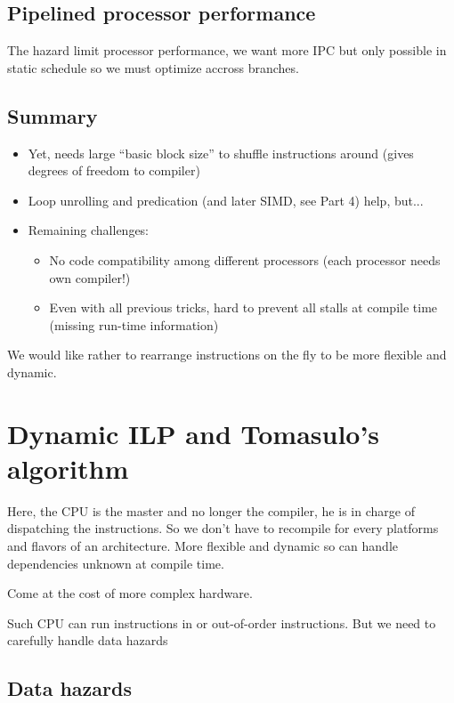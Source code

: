 \documentclass{report}
\begin{document}
\subsection{Pipelined processor performance}

The hazard limit processor performance, we want more IPC but only possible in static schedule so we must optimize accross branches.

\subsection{Summary}

\begin{itemize}
    \item Yet, needs large “basic block size” to shuffle instructions around (gives degrees of freedom to compiler)
    \item Loop unrolling and predication (and later SIMD, see Part 4) help, but...
    \item Remaining challenges:
    \begin{itemize}
        \item No code compatibility among different processors (each processor needs own compiler!)
        \item Even with all previous tricks, hard to prevent all stalls at compile time (missing run-time information)
    \end{itemize}
\end{itemize}

We would like rather to rearrange instructions on the fly to be more flexible and dynamic.

\section{Dynamic ILP and Tomasulo’s algorithm}

Here, the CPU is the master and no longer the compiler, he is in charge of dispatching the instructions. So we don't have to recompile for every platforms and flavors of an architecture. More flexible and dynamic so can handle dependencies unknown at compile time.

Come at the cost of more complex hardware.

Such CPU can run instructions in or out-of-order instructions. But we need to carefully handle data hazards

\subsection{Data hazards}
\end{document}
